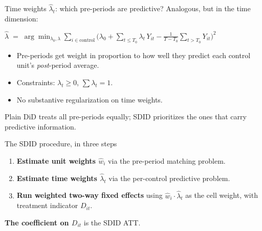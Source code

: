 \documentclass[aspectratio=169,11pt]{beamer}
\begin{document}
\begin{frame}{Time weights $\widehat{\lambda}_t$: which pre-periods are predictive?}
\vspace{0.5em}
Analogous, but in the time dimension:
\vspace{0.2em}
\begin{center}\small
$\widehat{\lambda} \;=\; \displaystyle\arg\min_{\lambda_0, \lambda} \sum_{i \in \text{control}}\big(\lambda_0 + \textstyle\sum_{t \leq T_0}\lambda_t\, Y_{it} - \frac{1}{T - T_0}\sum_{t > T_0} Y_{it}\big)^2$
\end{center}

\vspace{0.7em}
\begin{itemize}\small
  \item Pre-periods get weight in proportion to how well they predict each control unit's \textit{post}-period average.
  \item Constraints: $\lambda_t \geq 0$, $\sum \lambda_t = 1$.
  \item No substantive regularization on time weights. \;
\end{itemize}

\vspace{0.7em}
 \;Plain DiD treats all pre-periods equally; SDID prioritizes the ones that carry predictive information.
\end{frame}

\begin{frame}{The SDID procedure, in three steps}
\vspace{0.7em}
\begin{enumerate}
  \item \textbf{Estimate unit weights $\widehat{w}_i$} via the pre-period matching problem.
  \vspace{0.3em}
  \item \textbf{Estimate time weights $\widehat{\lambda}_t$} via the per-control predictive problem.
  \vspace{0.3em}
  \item \textbf{Run weighted two-way fixed effects} using $\widehat{w}_i \cdot \widehat{\lambda}_t$ as the cell weight, with treatment indicator $D_{it}$.
\end{enumerate}

\vspace{0.7em}
\textbf{The coefficient on $D_{it}$} is the SDID ATT.

\vspace{0.6em}
\end{frame}
\end{document}
